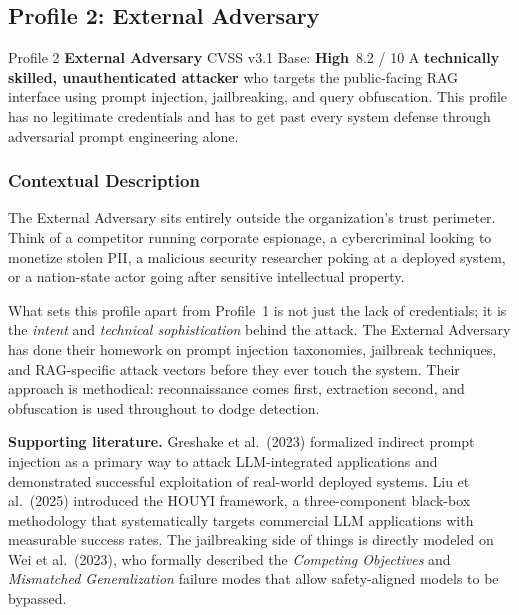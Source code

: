 \documentclass[12pt,a4paper]{report}
\newcommand{\badgehigh}{\colorbox{gray!15}{\footnotesize\textbf{High}}}
\begin{document}
\newpage
\subsection{Profile 2: External Adversary}

\begin{profilebanner}%
  {Profile 2 \enspace\textbf{External Adversary}}%
  {CVSS v3.1 Base: \badgehigh\ 8.2 / 10}
  \small
  A \textbf{technically skilled, unauthenticated attacker} who targets the
  public-facing RAG interface using prompt injection, jailbreaking, and query
  obfuscation. This profile has no legitimate credentials and has to get past
  every system defense through adversarial prompt engineering alone.
\end{profilebanner}

\subsubsection{Contextual Description}

\begin{prosebox}
The External Adversary sits entirely outside the organization's trust
perimeter. Think of a competitor running corporate espionage, a cybercriminal
looking to monetize stolen PII, a malicious security researcher poking at a
deployed system, or a nation-state actor going after sensitive intellectual
property.

What sets this profile apart from Profile~1 is not just the lack of
credentials; it is the \emph{intent} and \emph{technical sophistication}
behind the attack. The External Adversary has done their homework on prompt
injection taxonomies, jailbreak techniques, and RAG-specific attack vectors
before they ever touch the system. Their approach is methodical:
reconnaissance comes first, extraction second, and obfuscation is used
throughout to dodge detection.

\medskip
\textbf{Supporting literature.}
Greshake et al.\ (2023) formalized indirect prompt injection as a primary way
to attack LLM-integrated applications and demonstrated successful exploitation
of real-world deployed systems. Liu et al.\ (2025) introduced the HOUYI
framework, a three-component black-box methodology that systematically
targets commercial LLM applications with measurable success rates. The
jailbreaking side of things is directly modeled on Wei et al.\ (2023),
who formally described the \emph{Competing Objectives} and
\emph{Mismatched Generalization} failure modes that allow safety-aligned
models to be bypassed.
\end{prosebox}
\end{document}
